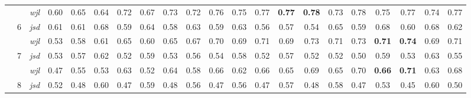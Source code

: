 \begin{table}[ht]
{{\begin{tabular}{ccccccccccccccccccccc}
\multicolumn{1}{c|}{} &  & \multicolumn{1}{c|}{\textit{wjl}} & 0.60 & \multicolumn{1}{c|}{0.65} & 0.64 & \multicolumn{1}{c|}{0.72} & 0.67 & \multicolumn{1}{c|}{0.73} & 0.72 & \multicolumn{1}{c|}{0.76} & \cellcolor{gray!25}0.75 & \multicolumn{1}{c|}{\cellcolor{gray!25}0.77} & \textbf{0.77} & \multicolumn{1}{c|}{\textbf{0.78}} & 0.73 & \multicolumn{1}{c|}{0.78} & 0.75 & \multicolumn{1}{c|}{0.77} & 0.74 & \multicolumn{1}{c|}{0.77} \\ \cline{2-21} 
\multicolumn{1}{c|}{} & \multirow{2}{*}{6} & \multicolumn{1}{c|}{\textit{jsd}} & 0.61 & \multicolumn{1}{c|}{0.61} & 0.68 & \multicolumn{1}{c|}{0.59} & 0.64 & \multicolumn{1}{c|}{0.58} & 0.63 & \multicolumn{1}{c|}{0.59} & 0.63 & \multicolumn{1}{c|}{0.56} & \cellcolor{gray!25}0.57 & \multicolumn{1}{c|}{\cellcolor{gray!25}0.54} & 0.65 & \multicolumn{1}{c|}{0.59} & 0.68 & \multicolumn{1}{c|}{0.60} & 0.68 & \multicolumn{1}{c|}{0.62} \\
\multicolumn{1}{c|}{} &  & \multicolumn{1}{c|}{\textit{wjl}} & 0.53 & \multicolumn{1}{c|}{0.58} & 0.61 & \multicolumn{1}{c|}{0.65} & 0.60 & \multicolumn{1}{c|}{0.65} & 0.67 & \multicolumn{1}{c|}{0.70} & 0.69 & \multicolumn{1}{c|}{0.71} & \cellcolor{gray!25}0.69 & \multicolumn{1}{c|}{\cellcolor{gray!25}0.73} & 0.71 & \multicolumn{1}{c|}{0.73} & \textbf{0.71} & \multicolumn{1}{c|}{\textbf{0.74}} & 0.69 & \multicolumn{1}{c|}{0.71} \\ \cline{2-21} 
\multicolumn{1}{c|}{} & \multirow{2}{*}{7} & \multicolumn{1}{c|}{\textit{jsd}} & 0.53 & \multicolumn{1}{c|}{0.57} & 0.62 & \multicolumn{1}{c|}{0.52} & 0.59 & \multicolumn{1}{c|}{0.53} & 0.56 & \multicolumn{1}{c|}{0.54} & 0.58 & \multicolumn{1}{c|}{0.52} & 0.57 & \multicolumn{1}{c|}{0.52} & \cellcolor{gray!25}0.52 & \multicolumn{1}{c|}{\cellcolor{gray!25}0.50} & 0.59 & \multicolumn{1}{c|}{0.53} & 0.63 & \multicolumn{1}{c|}{0.55} \\
\multicolumn{1}{c|}{} &  & \multicolumn{1}{c|}{\textit{wjl}} & 0.47 & \multicolumn{1}{c|}{0.55} & 0.53 & \multicolumn{1}{c|}{0.63} & 0.52 & \multicolumn{1}{c|}{0.64} & 0.58 & \multicolumn{1}{c|}{0.66} & 0.62 & \multicolumn{1}{c|}{0.66} & 0.65 & \multicolumn{1}{c|}{0.69} & \cellcolor{gray!25}0.65 & \multicolumn{1}{c|}{\cellcolor{gray!25}0.70} & \textbf{0.66} & \multicolumn{1}{c|}{\textbf{0.71}} & 0.63 & \multicolumn{1}{c|}{0.68} \\ \cline{2-21} 
\multicolumn{1}{c|}{} & \multirow{2}{*}{8} & \multicolumn{1}{c|}{\textit{jsd}} & 0.52 & \multicolumn{1}{c|}{0.48} & 0.60 & \multicolumn{1}{c|}{0.47} & 0.59 & \multicolumn{1}{c|}{0.48} & 0.56 & \multicolumn{1}{c|}{0.47} & 0.56 & \multicolumn{1}{c|}{0.47} & 0.57 & \multicolumn{1}{c|}{0.48} & 0.58 & \multicolumn{1}{c|}{0.47} & \cellcolor{gray!25}0.53 & \multicolumn{1}{c|}{\cellcolor{gray!25}0.45} & 0.60 & \multicolumn{1}{c|}{0.50} \\

\end{tabular}}}
\end{table}
